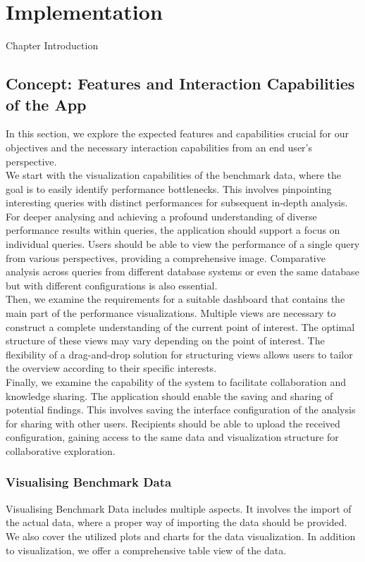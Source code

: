 
\chapter{Implementation}\label{chapter:implementation}
Chapter Introduction


\section{Concept: Features and Interaction Capabilities of the App}
In this section, we explore the expected features and capabilities crucial for our objectives and the necessary interaction capabilities from an end user's perspective.\\
We start with the visualization capabilities of the benchmark data, where the goal is to easily identify performance bottlenecks. This involves pinpointing interesting queries with distinct performances for subsequent in-depth analysis.\\
For deeper analysing and achieving a profound understanding of diverse performance results within queries, the application should support a focus on individual queries. Users should be able to view the performance of a single query from various perspectives, providing a comprehensive image. Comparative analysis across queries from different database systems or even the same database but with different configurations is also essential.\\ 
Then, we examine the requirements for a suitable dashboard that contains the main part of the performance visualizations. Multiple views are necessary to construct a complete understanding of the current point of interest. The optimal structure of these views may vary depending on the point of interest. The flexibility of a drag-and-drop solution for structuring views allows users to tailor the overview according to their specific interests.\\
Finally, we examine the capability of the system to facilitate collaboration and knowledge sharing. The application should enable the saving and sharing of potential findings. This involves saving the interface configuration of the analysis for sharing with other users. Recipients should be able to upload the received configuration, gaining access to the same data and visualization structure for collaborative exploration.


\subsection{Visualising Benchmark Data}
Visualising Benchmark Data includes multiple aspects. It involves the import of the actual data, where a proper way of importing the data should be provided. We also cover the utilized plots and charts for the data visualization. In addition to visualization, we offer a comprehensive table view of the data.


